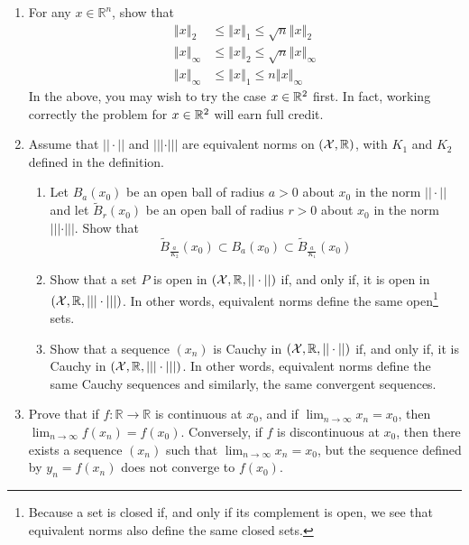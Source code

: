 \documentclass[letterpaper]{article}
\begin{document}
\begin{enumerate}

\item  For any
$x\in\mathbb{R}^{n}$, show that
\begin{align*}
\left\Vert x\right\Vert _{2} & \le\left\Vert x\right\Vert _{1}\le\sqrt{n}\left\Vert x\right\Vert _{2}\\
\left\Vert x\right\Vert _{\infty} & \le\left\Vert x\right\Vert _{2}\le\sqrt{n}\left\Vert x\right\Vert _{\infty}\\
\left\Vert x\right\Vert _{\infty} & \le\left\Vert x\right\Vert _{1}\le n\left\Vert x\right\Vert _{\infty}
\end{align*}
 In  the above, you may wish to try the case $x\in \mathbb R^2$ first.
In fact, working correctly the problem for $x \in \mathbb R^2$ will earn full credit.

\item Assume that $||\cdot||$ and $|||\cdot|||$ are equivalent norms on $({\cal X}, \mathbb R)$, with $K_1$ and $K_2$ defined in the definition.
\begin{enumerate}
\renewcommand{\labelenumi}{(\alph{enumi})}
\setlength{\itemsep}{.1in}

    \item  Let $B_a(x_0)$ be an open ball of radius $a>0$ about $x_0$  in the norm $ ||\cdot||$ and let $\widetilde{B}_r(x_0)$ be an open ball of radius $r>0$ about $x_0$ in the norm $ |||\cdot|||$. Show that
        $$ \widetilde{B}_{\frac{a}{K_2}}(x_0) \subset B_a(x_0) \subset \widetilde{B}_{\frac{a}{K_1}}(x_0) $$

        \item Show that a set $P$ is open in $({\cal X}, \mathbb R, ||\cdot ||)$ if, and only if, it is open in $({\cal X}, \mathbb R, |||\cdot |||)$. In other words, equivalent norms define the same open\footnote{Because a set is closed if, and only if its complement is open, we see that equivalent norms also define the same closed sets.} sets.

            \item Show that a sequence $(x_n)$ is Cauchy in $({\cal X}, \mathbb R, ||\cdot ||)$ if, and only if, it is Cauchy in $({\cal X}, \mathbb R, |||\cdot |||)$. In other words, equivalent norms define the same Cauchy sequences and similarly, the same convergent sequences.

\end{enumerate}



\item Prove that if $f:\mathbb{R}\longrightarrow\mathbb{R}$ is continuous
at $x_{0}$, and if $\lim_{n\rightarrow\infty}x_{n}=x_{0}$, then
$\lim_{n\rightarrow\infty}f\left(x_{n}\right)=f\left(x_{0}\right)$. Conversely, if $f$ is discontinuous at $x_0$, then there exists a sequence $(x_n)$ such that $\lim_{n\rightarrow\infty} x_{n}=x_{0}$, but the sequence defined by $y_n = f(x_n)$ does not converge to $f(x_0)$.




\end{enumerate}
\end{document}
